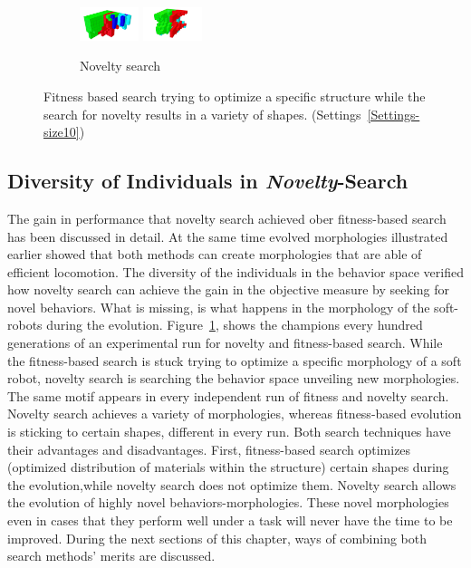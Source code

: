 \begin{figure}[t!]
\begin{subfigure}[b]{1.0\textwidth}
\includegraphics[width=0.19\textwidth]{../Figures/Robots/n_4_g_900.jpg}
\includegraphics[width=0.19\textwidth]{../Figures/Robots/n_4_g_1000.jpg}
\caption{Novelty search}
\end{subfigure}
\caption{Fitness based search trying to optimize a specific structure while the search for novelty results in a variety of shapes. (Settings~\ref{Settings-size10})}
\label{fig:morphologies}
\end{figure}


\subsection{Diversity of Individuals in \emph{Novelty}-Search}

The gain in performance that novelty search achieved ober fitness-based search has been discussed in detail.  At the same time evolved morphologies illustrated earlier showed that both methods can create morphologies that are able of efficient locomotion. The diversity of the individuals in the behavior space verified how novelty search can achieve the gain in the objective measure by seeking for novel behaviors. What is missing, is what happens in the morphology of the soft-robots during the evolution. Figure~\ref{fig:morphologies}, shows the champions every hundred generations of an experimental run for novelty and fitness-based search. While the fitness-based search is stuck trying to optimize a specific morphology of a soft robot, novelty search is searching the behavior space unveiling new morphologies. The same motif appears in every independent run of fitness and novelty search. Novelty search achieves a variety of morphologies, whereas fitness-based evolution is sticking to certain shapes, different in every run. Both search techniques have their advantages and disadvantages. First, fitness-based search optimizes (optimized distribution of materials within the structure) certain shapes during the evolution,while novelty search does not optimize them. Novelty search allows the evolution of highly novel behaviors-morphologies. These novel morphologies even in cases that they perform well under a task will never have the time to be improved. During the next sections of this chapter, ways of combining both search methods' merits are discussed.

